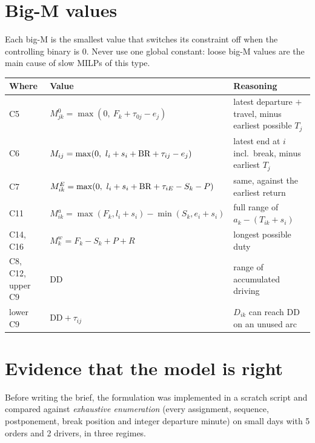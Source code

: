 \documentclass[11pt,a4paper]{article}
\newcommand{\DD}{\mathrm{DD}}\newcommand{\DS}{\mathrm{DS}}\newcommand{\WD}{\mathrm{WD}}
\begin{document}
\section{Big-M values}

Each big-M is the smallest value that switches its constraint off when the controlling binary is 0. Never use one global constant: loose big-M values are the main cause of slow MILPs of this type.

\begin{center}\small
\begin{tabularx}{\textwidth}{@{}l l X@{}}
\toprule
\textbf{Where} & \textbf{Value} & \textbf{Reasoning} \\
\midrule
C5 & $M^0_{jk} = \max(0,\ F_k + \tau_{0j} - e_j)$ & latest departure $+$ travel, minus earliest possible $T_j$ \\
C6 & $M_{ij} = \max(0,\ l_i + s_i + \mathrm{BR} + \tau_{ij} - e_j)$ & latest end at $i$ incl.\ break, minus earliest $T_j$ \\
C7 & $M^E_{ik} = \max(0,\ l_i + s_i + \mathrm{BR} + \tau_{iE} - S_k - P)$ & same, against the earliest return \\
C11 & $M^a_{ik} = \max(F_k, l_i+s_i) - \min(S_k, e_i+s_i)$ & full range of $a_k - (T_{ik}+s_i)$ \\
C14, C16 & $M^w_k = F_k - S_k + P + R$ & longest possible duty \\
C8, C12, upper C9 & $\DD$ & range of accumulated driving \\
lower C9 & $\DD + \tau_{ij}$ & $D_{ik}$ can reach $\DD$ on an unused arc \\
\bottomrule
\end{tabularx}
\end{center}

\section{Evidence that the model is right}

Before writing the brief, the formulation was implemented in a scratch script and compared against \emph{exhaustive enumeration} (every assignment, sequence, postponement, break position and integer departure minute) on small days with 5 orders and 2 drivers, in three regimes.
\end{document}
